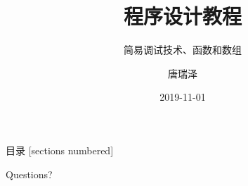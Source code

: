 \documentclass[10pt]{beamer}
\title{程序设计教程}
\subtitle{简易调试技术、函数和数组}
\date{2019-11-01}
\author{唐瑞泽}
\institute{tangruize@smail.nju.edu.cn}
\begin{document}
	
\maketitle

\begin{frame}{目录}
	[sections numbered]
	\tableofcontents[hideallsubsections]
\end{frame}







\begin{frame}[standout]
	Questions?
\end{frame}
\end{document}
